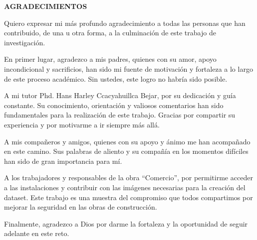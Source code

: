 \thispagestyle{plain}

\begin{center}
  \textbf{AGRADECIMIENTOS}
\end{center}

\vspace{1cm}

\noindent

Quiero expresar mi más profundo agradecimiento a todas las personas que han contribuido, de una u otra forma, a la culminación de este trabajo de investigación.

En primer lugar, agradezco a mis padres, quienes con su amor, apoyo incondicional y sacrificios, han sido mi fuente de motivación y fortaleza a lo largo de este proceso académico. Sin ustedes, este logro no habría sido posible.

A mi tutor Phd. Hans Harley Ccacyahuillca Bejar, por su dedicación y guía constante. Su conocimiento, orientación y valiosos comentarios han sido fundamentales para la realización de este trabajo. Gracias por compartir su experiencia y por motivarme a ir siempre más allá.

A mis compañeros y amigos, quienes con su apoyo y ánimo me han acompañado en este camino. Sus palabras de aliento y su compañía en los momentos difíciles han sido de gran importancia para mí.

A los trabajadores y responsables de la obra ``Comercio'', por permitirme acceder a las instalaciones y contribuir con las imágenes necesarias para la creación del dataset. Este trabajo es una muestra del compromiso que todos compartimos por mejorar la seguridad en las obras de construcción.

Finalmente, agradezco a Dios por darme la fortaleza y la oportunidad de seguir adelante en este reto.

\vfill

\pagebreak
